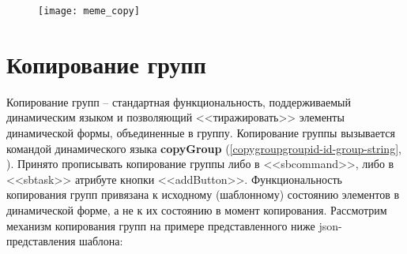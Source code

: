 \documentclass[../index.tex]{subfiles}
\begin{document}
\begin{figure}[h]
	\texttt{[image: meme\_copy]}
	\centering
\end{figure}

\section{Копирование групп}


Копирование групп -- стандартная функциональность, поддерживаемый динамическим языком и позволяющий <<тиражировать>> элементы динамической формы, объединенные в группу. Копирование группы вызывается командой динамического языка \textbf{copyGroup} (\autoref{copygroupgroupid-id-group-string}, ). Принято прописывать копирование группы либо в <<sbcommand>>, либо в <<sbtask>> атрибуте кнопки <<addButton>>.
Функциональность копирования групп привязана к исходному (шаблонному) состоянию элементов в динамической форме, а не к их состоянию в момент копирования.
Рассмотрим механизм копирования групп на примере представленного ниже json-представления шаблона:
\end{document}
